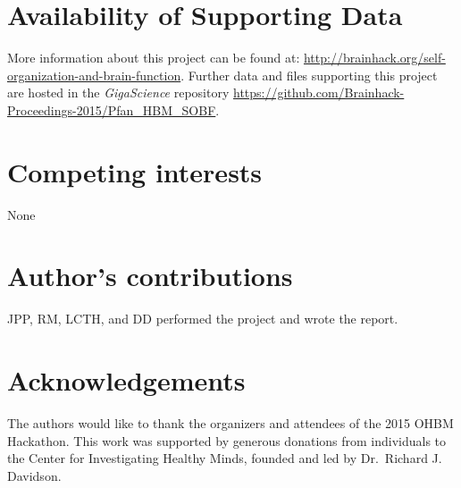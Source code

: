 \documentclass[twocolumn]{bmcart}%
\begin{document}
\begin{backmatter}

\section*{Availability of Supporting Data}
More information about this project can be found at: \url{http://brainhack.org/self-organization-and-brain-function}. Further data and files supporting this project are hosted in the \emph{GigaScience} repository \url{https://github.com/Brainhack-Proceedings-2015/Pfan_HBM_SOBF}.

\section*{Competing interests}
None

\section*{Author's contributions}
JPP, RM, LCTH, and DD performed the project and wrote the report.

\section*{Acknowledgements}
The authors would like to thank the organizers and attendees of the 2015
OHBM Hackathon. This work was supported by generous donations from
individuals to the Center for Investigating Healthy Minds, founded and
led by Dr.~Richard J. Davidson.

  
  


\end{backmatter}
\end{document}
